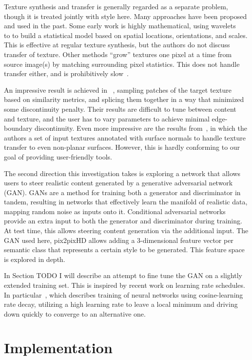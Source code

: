 \documentclass[10pt,twocolumn,letterpaper]{article}
\begin{document}
Texture synthesis and transfer is generally regarded as a separate problem, though it is treated jointly with style here. Many approaches have been proposed and used in the past. Some early work is highly mathematical, using wavelets ~\cite{portilla2000parametric} to to build a statistical model based on spatial locations, orientations, and scales. This is effective at regular texture synthesis, but the authors do not discuss transfer of texture. Other methods ``grow'' textures one pixel at a time from source image(s) by matching surrounding pixel statistics. This does not handle transfer either, and is prohibitively slow~\cite{efros1999texture}.

An impressive result is achieved in ~\cite{efros2001image}, sampling patches of the target texture based on similarity metrics, and splicing them together in a way that minimized some discontinuity penalty. Their results are difficult to tune between content and texture, and the user has to vary  parameters to achieve minimal edge-boundary discontinuity. Even more impressive are the results from~\cite{diamanti2015synthesis}, in which the authors a set of input textures annotated with surface normals to handle texture transfer to even non-planar surfaces. However, this is hardly conforming to our goal of providing user-friendly tools.

The second direction this investigation takes is exploring a network that allows users to steer realistic content generated by a generative adversarial network (GAN). GANs are a method for training both a generator and discriminator in tandem, resulting in networks that effectively learn the manifold of realistic data, mapping random noise as inputs onto it. Conditional adversarial networks provide an extra input to both the generator and discriminator during training. At test time, this allows steering content generation via the additional input. The GAN used here, pix2pixHD allows adding a 3-dimensional feature vector per semantic class that represents a certain style to be generated. This feature space is explored in depth.

In Section TODO I will describe an attempt to fine tune the GAN on a slightly extended training set. This is inspired by recent work on learning rate schedules. In particular~\cite{loshchilov2016sgdr}, which describes training of neural networks using cosine-learning rate decay, utilizing a high learning rate to leave a local minimum and driving down quickly to converge to an alternative one. 

\section{Implementation}
\label{sec:implementation}
\end{document}
